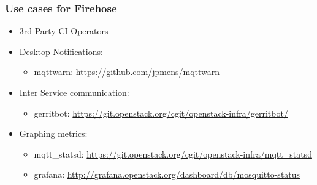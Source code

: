 \documentclass[aspectratio=169,11pt,hyperref={colorlinks=true}]{beamer}
\begin{document}
\begin{frame}
    \frametitle{Use cases for Firehose}
    \begin{itemize}
        \item 3rd Party CI Operators
        \item Desktop Notifications:
            \begin{itemize}
                \item mqttwarn: \href{https://github.com/jpmens/mqttwarn}{https://github.com/jpmens/mqttwarn}
            \end{itemize}
        \item Inter Service communication:
            \begin{itemize}
                \item gerritbot: \href{https://git.openstack.org/cgit/openstack-infra/gerritbot/}{https://git.openstack.org/cgit/openstack-infra/gerritbot/}
            \end{itemize}
        \item Graphing metrics:
            \begin{itemize}
                \item mqtt\_statsd: \href{https://git.openstack.org/cgit/openstack-infra/mqtt\_statsd}{https://git.openstack.org/cgit/openstack-infra/mqtt\_statsd}
                \item grafana: \href{http://grafana.openstack.org/dashboard/db/mosquitto-status}{http://grafana.openstack.org/dashboard/db/mosquitto-status}
            \end{itemize}
    \end{itemize}
\end{frame}
\end{document}
